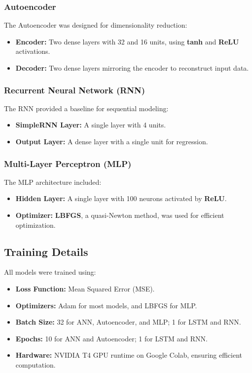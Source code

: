 \documentclass[conference]{IEEEtran}
\begin{document}
\subsubsection{Autoencoder}
The Autoencoder was designed for dimensionality reduction:
\begin{itemize}
    \item \textbf{Encoder:} Two dense layers with 32 and 16 units, using \textbf{tanh} and \textbf{ReLU} activations.
    \item \textbf{Decoder:} Two dense layers mirroring the encoder to reconstruct input data.
\end{itemize}

\subsubsection{Recurrent Neural Network (RNN)}
The RNN provided a baseline for sequential modeling:
\begin{itemize}
    \item \textbf{SimpleRNN Layer:} A single layer with 4 units.
    \item \textbf{Output Layer:} A dense layer with a single unit for regression.
\end{itemize}

\subsubsection{Multi-Layer Perceptron (MLP)}
The MLP architecture included:
\begin{itemize}
    \item \textbf{Hidden Layer:} A single layer with 100 neurons activated by \textbf{ReLU}.
    \item \textbf{Optimizer:} \textbf{LBFGS}, a quasi-Newton method, was used for efficient optimization.
\end{itemize}

\subsection{Training Details}
All models were trained using:
\begin{itemize}
    \item \textbf{Loss Function:} Mean Squared Error (MSE).
    \item \textbf{Optimizers:} Adam for most models, and LBFGS for MLP.
    \item \textbf{Batch Size:} 32 for ANN, Autoencoder, and MLP; 1 for LSTM and RNN.
    \item \textbf{Epochs:} 10 for ANN and Autoencoder; 1 for LSTM and RNN.
    \item \textbf{Hardware:} NVIDIA T4 GPU runtime on Google Colab, ensuring efficient computation.
\end{itemize}
\end{document}
